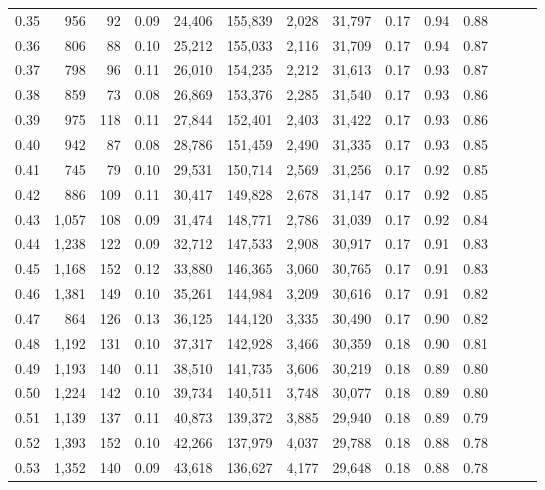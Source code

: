 \begin{tabular}{rrrrrrrrrrrrrr}
0.35 &    956 &     92 &  0.09 &   24,406 &  155,839 &   2,028 &  31,797 &  0.17 &  0.94 &      0.88 \\
0.36 &    806 &     88 &  0.10 &   25,212 &  155,033 &   2,116 &  31,709 &  0.17 &  0.94 &      0.87 \\
0.37 &    798 &     96 &  0.11 &   26,010 &  154,235 &   2,212 &  31,613 &  0.17 &  0.93 &      0.87 \\
0.38 &    859 &     73 &  0.08 &   26,869 &  153,376 &   2,285 &  31,540 &  0.17 &  0.93 &      0.86 \\
0.39 &    975 &    118 &  0.11 &   27,844 &  152,401 &   2,403 &  31,422 &  0.17 &  0.93 &      0.86 \\
0.40 &    942 &     87 &  0.08 &   28,786 &  151,459 &   2,490 &  31,335 &  0.17 &  0.93 &      0.85 \\
0.41 &    745 &     79 &  0.10 &   29,531 &  150,714 &   2,569 &  31,256 &  0.17 &  0.92 &      0.85 \\
0.42 &    886 &    109 &  0.11 &   30,417 &  149,828 &   2,678 &  31,147 &  0.17 &  0.92 &      0.85 \\
0.43 &  1,057 &    108 &  0.09 &   31,474 &  148,771 &   2,786 &  31,039 &  0.17 &  0.92 &      0.84 \\
0.44 &  1,238 &    122 &  0.09 &   32,712 &  147,533 &   2,908 &  30,917 &  0.17 &  0.91 &      0.83 \\
0.45 &  1,168 &    152 &  0.12 &   33,880 &  146,365 &   3,060 &  30,765 &  0.17 &  0.91 &      0.83 \\
0.46 &  1,381 &    149 &  0.10 &   35,261 &  144,984 &   3,209 &  30,616 &  0.17 &  0.91 &      0.82 \\
0.47 &    864 &    126 &  0.13 &   36,125 &  144,120 &   3,335 &  30,490 &  0.17 &  0.90 &      0.82 \\
0.48 &  1,192 &    131 &  0.10 &   37,317 &  142,928 &   3,466 &  30,359 &  0.18 &  0.90 &      0.81 \\
0.49 &  1,193 &    140 &  0.11 &   38,510 &  141,735 &   3,606 &  30,219 &  0.18 &  0.89 &      0.80 \\
0.50 &  1,224 &    142 &  0.10 &   39,734 &  140,511 &   3,748 &  30,077 &  0.18 &  0.89 &      0.80 \\
0.51 &  1,139 &    137 &  0.11 &   40,873 &  139,372 &   3,885 &  29,940 &  0.18 &  0.89 &      0.79 \\
0.52 &  1,393 &    152 &  0.10 &   42,266 &  137,979 &   4,037 &  29,788 &  0.18 &  0.88 &      0.78 \\
0.53 &  1,352 &    140 &  0.09 &   43,618 &  136,627 &   4,177 &  29,648 &  0.18 &  0.88 &      0.78 \\

\end{tabular}
